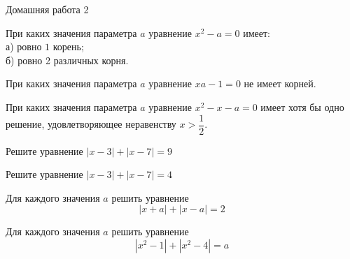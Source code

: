 \begin{homework}[number=2]
	\begin{listofex}
		\item Домашняя работа 2
	\end{listofex}
\end{homework}

\begin{class}[number=5]
	\begin{listofex}
		\item При каких значения параметра \( a \) уравнение \( x^2-a=0 \) имеет:\\
		а) ровно \( 1 \) корень;\\
		б) ровно 2 различных корня.
		\item При каких значения параметра \( a \) уравнение \( xa-1=0 \) не имеет корней.
		\item При каких значения параметра \( a \) уравнение \( x^2-x-a=0 \) имеет хотя бы одно решение, удовлетворяющее неравенству \( x>\dfrac{1}{2} \).
		\item Решите уравнение \( |x-3|+|x-7|=9 \)
		\item Решите уравнение \( |x-3|+|x-7|=4 \)
		\item Для каждого значения \( a \) решить уравнение
		\[ |x+a|+|x-a|=2 \]
		\item Для каждого значения \( a \) решить уравнение
		\[ |x^2-1|+|x^2-4|=a \]
	\end{listofex}
\end{class}

